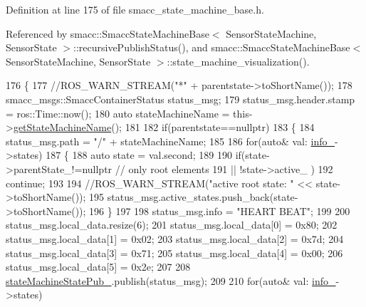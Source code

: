 Definition at line 175 of file smacc\+\_\+state\+\_\+machine\+\_\+base.\+h.



Referenced by smacc\+::\+Smacc\+State\+Machine\+Base$<$ Sensor\+State\+Machine, Sensor\+State $>$\+::recursive\+Publish\+Status(), and smacc\+::\+Smacc\+State\+Machine\+Base$<$ Sensor\+State\+Machine, Sensor\+State $>$\+::state\+\_\+machine\+\_\+visualization().


\begin{DoxyCode}
176     \{
177         \textcolor{comment}{//ROS\_WARN\_STREAM("*" + parentstate->toShortName());}
178         smacc\_msgs::SmaccContainerStatus status\_msg;
179         status\_msg.header.stamp = ros::Time::now();
180         \textcolor{keyword}{auto} stateMachineName = this->\hyperlink{classsmacc_1_1ISmaccStateMachine_a2d0b1742f17dd77d5df217153e8b5259}{getStateMachineName}();
181 
182         \textcolor{keywordflow}{if}(parentstate==\textcolor{keyword}{nullptr})
183         \{
184             status\_msg.path = \textcolor{stringliteral}{"/"} + stateMachineName;
185 
186             \textcolor{keywordflow}{for}(\textcolor{keyword}{auto}& val: \hyperlink{classsmacc_1_1ISmaccStateMachine_a5ec3201cbddab4f062f572fb33021041}{info\_}->states)
187             \{
188                 \textcolor{keyword}{auto} state = val.second;
189 
190                 \textcolor{keywordflow}{if}(state->parentState\_!=\textcolor{keyword}{nullptr} \textcolor{comment}{// only root elements}
191                     || !state->active\_ )
192                         \textcolor{keywordflow}{continue};     
193 
194                 \textcolor{comment}{//ROS\_WARN\_STREAM("active root state: " << state->toShortName());}
195                 status\_msg.active\_states.push\_back(state->toShortName());
196             \}
197 
198             status\_msg.info = \textcolor{stringliteral}{"HEART BEAT"};
199     
200             status\_msg.local\_data.resize(6);
201             status\_msg.local\_data[0] = 0x80;
202             status\_msg.local\_data[1] = 0x02;
203             status\_msg.local\_data[2] = 0x7d;
204             status\_msg.local\_data[3] = 0x71;
205             status\_msg.local\_data[4] = 0x00;
206             status\_msg.local\_data[5] = 0x2e;
207 
208             \hyperlink{structsmacc_1_1SmaccStateMachineBase_a7c76e7a7d6c00d9831472297ff51e38c}{stateMachineStatePub\_}.publish(status\_msg);
209 
210             \textcolor{keywordflow}{for}(\textcolor{keyword}{auto}& val: \hyperlink{classsmacc_1_1ISmaccStateMachine_a5ec3201cbddab4f062f572fb33021041}{info\_}->states)

\end{DoxyCode}
